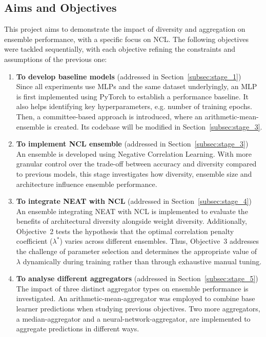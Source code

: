 \subsection{Aims and Objectives}
This project aims to demonstrate the impact of diversity and aggregation on ensemble performance, with a specific focus on NCL. The following objectives were tackled sequentially, with each objective refining the constraints and assumptions of the previous one: 
\begin{enumerate}
    \item \textbf{To develop baseline models} (addressed in Section~\ref{subsec:stage_1}) \\
    Since all experiments use MLPs and the same dataset underlyingly, an MLP is first implemented using PyTorch to establish a performance baseline. It also helps identifying key hyperparameters, e.g. number of training epochs. Then, a committee-based approach is introduced, where an arithmetic-mean-ensemble is created. Its codebase will be modified in Section~\ref{subsec:stage_3}. 

    \item \textbf{To implement NCL ensemble} (addressed in Section~\ref{subsec:stage_3}) \\
    An ensemble is developed using Negative Correlation Learning. With more granular control over the trade-off between accuracy and diversity compared to previous models, this stage investigates how diversity, ensemble size and architecture influence ensemble performance. 

    \item \textbf{To integrate NEAT with NCL} (addressed in Section~\ref{subsec:stage_4}) \\
    An ensemble integrating NEAT with NCL is implemented to evaluate the benefits of architectural diversity alongside weight diversity. Additionally, Objective~2 tests the hypothesis that the optimal correlation penalty coefficient ($\lambda^*$) varies across different ensembles. Thus, Objective~3 addresses the challenge of parameter selection and determines the appropriate value of $\lambda$ dynamically during training rather than through exhaustive manual tuning. 

    \item \textbf{To analyse different aggregators} (addressed in Section~\ref{subsec:stage_5}) \\
    The impact of three distinct aggregator types on ensemble performance is investigated. An arithmetic-mean-aggregator was employed to combine base learner predictions when studying previous objectives. Two more aggregators, a median-aggregator and a neural-network-aggregator, are implemented to aggregate predictions in different ways. 


\end{enumerate}
